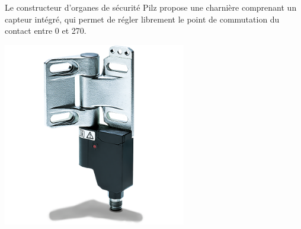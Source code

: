 \begin{minipage}[c]{0.6\textwidth}
    Le constructeur d'organes de sécurité Pilz propose une charnière comprenant un capteur intégré, qui permet de régler librement le point de commutation du contact entre 0\textdegree{} et 270\textdegree{}.

\end{minipage}\hfill
\begin{minipage}[c]{0.35\textwidth}
    \begin{center}
        \includegraphics[width=0.6\textwidth]{assets/figures/Protections_laser/Securite_electrique/charniere_pilz.png}
    \end{center}
    \label{charniere_pilz}
\end{minipage}

